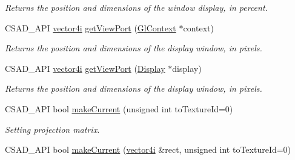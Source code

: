 \begin{DoxyCompactItemize}
\begin{DoxyCompactList}\small\item\em Returns the position and dimensions of the window display, in percent. \end{DoxyCompactList}\item 
\hypertarget{classcsad_1_1_camera_aa99f6cef6f085590aede1b6f158db1d7}{C\-S\-A\-D\-\_\-\-A\-P\-I \hyperlink{classbt_1_1vector4i}{vector4i} \hyperlink{classcsad_1_1_camera_aa99f6cef6f085590aede1b6f158db1d7}{get\-View\-Port} (\hyperlink{classcsad_1_1_gl_context}{Gl\-Context} $\ast$context)}\label{classcsad_1_1_camera_aa99f6cef6f085590aede1b6f158db1d7}

\begin{DoxyCompactList}\small\item\em Returns the position and dimensions of the display window, in pixels. \end{DoxyCompactList}\item 
\hypertarget{classcsad_1_1_camera_a8bc7d426bf9cd731d6bd0818082dde34}{C\-S\-A\-D\-\_\-\-A\-P\-I \hyperlink{classbt_1_1vector4i}{vector4i} \hyperlink{classcsad_1_1_camera_a8bc7d426bf9cd731d6bd0818082dde34}{get\-View\-Port} (\hyperlink{classcsad_1_1_display}{Display} $\ast$display)}\label{classcsad_1_1_camera_a8bc7d426bf9cd731d6bd0818082dde34}

\begin{DoxyCompactList}\small\item\em Returns the position and dimensions of the display window, in pixels. \end{DoxyCompactList}\item 
\hypertarget{classcsad_1_1_camera_ae48f1f5d3baaacf1a1b793e45c2389c1}{C\-S\-A\-D\-\_\-\-A\-P\-I bool \hyperlink{classcsad_1_1_camera_ae48f1f5d3baaacf1a1b793e45c2389c1}{make\-Current} (unsigned int to\-Texture\-Id=0)}\label{classcsad_1_1_camera_ae48f1f5d3baaacf1a1b793e45c2389c1}

\begin{DoxyCompactList}\small\item\em Setting projection matrix. \end{DoxyCompactList}\item 
\hypertarget{classcsad_1_1_camera_a59dd6f411c4fd88191751842cc963f9d}{C\-S\-A\-D\-\_\-\-A\-P\-I bool \hyperlink{classcsad_1_1_camera_a59dd6f411c4fd88191751842cc963f9d}{make\-Current} (\hyperlink{classbt_1_1vector4i}{vector4i} \&rect, unsigned int to\-Texture\-Id=0)}\label{classcsad_1_1_camera_a59dd6f411c4fd88191751842cc963f9d}


\end{DoxyCompactItemize}
